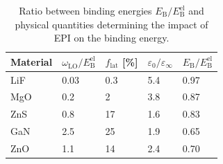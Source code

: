 \begin{table}[t]
\captionsetup{format=plain}
 \caption[Physical quantities determining the impact of EPI on the excitonic binding energy renormalization.]{Ratio between binding energies $E_\text{B}^{\phantom{l}}/E_\text{B}^\text{el}$ and physical quantities determining the impact of EPI on the binding energy.\label{tab_strength}}
 \vspace{1mm}
 \centering
 \begin{tabularx}{\textwidth}{YYYYY}
    \hline
    \hline
 Material  & $\omega^{\phantom{I}}_\text{LO}/E^\text{el}_\text{B}$& $f_\text{lat}$ [\%] & $\varepsilon_0/\varepsilon_\infty$ & $E_\text{B}^{\phantom{l}}/E_\text{B}^\text{el}$ \\
\hline
LiF    & 0.03 & 0.3 &  5.4   & 0.97 \\
MgO    & 0.2  & 2 &  3.8   & 0.87   \\
ZnS    & 0.8  & 17 &  1.6   & 0.83  \\
GaN    & 2.5  &  25  & 1.9   & 0.65  \\
ZnO    & 1.1  &  14 & 2.4   & 0.70  \\
    \hline
    \hline
\end{tabularx}  
\end{table}
%
